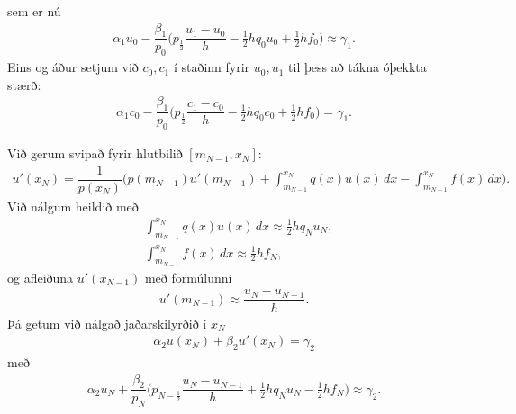 \documentclass[a4paper,10pt,icelandic]{sphinxmanual}
\begin{document}
sem er nú
\begin{equation*}
\begin{split}\alpha_1u_0-\dfrac {\beta_1}{p_0}\bigg(
p_{\frac 12}\dfrac{u_1-u_0}{h}
-\tfrac 12 h q_0u_0+ \tfrac 12 hf_0\bigg)\approx \gamma_1.\end{split}
\end{equation*}
Eins og áður setjum við \(c_0, c_1\) í staðinn fyrir \(u_0, u_1\) til þess að tákna óþekkta stærð:
\begin{equation*}
\begin{split}\alpha_1 c_0-\dfrac {\beta_1}{p_0}\bigg(
p_{\frac 12}\dfrac{c_1-c_0}{h}
-\tfrac 12 h q_0c_0+\tfrac 12 hf_0\bigg)=\gamma_1.\end{split}
\end{equation*}

Við gerum svipað fyrir hlutbilið \([ m_{N-1}, x_N]\):
\begin{equation*}
\begin{split}u'(x_N)=\dfrac 1{p(x_N)}\bigg(p(m_{N-1})u'(m_{N-1})
+\int_{m_{N-1}}^{x_N}q(x)u(x)\, dx-
\int_{m_{N-1}}^{x_N}f(x)\, dx\bigg).\end{split}
\end{equation*}
Við nálgum heildið með
\begin{equation*}
\begin{split}& \int_{m_{N-1}}^{x_N}q(x)u(x)\, dx \approx \tfrac 12h
q_Nu_N, \\
& \int_{m_{N-1}}^{x_N}f(x)\, dx \approx \tfrac 12h f_N,\end{split}
\end{equation*}
og afleiðuna \(u'(x_{N-1})\) með formúlunni
\begin{equation*}
\begin{split}u'(m_{N-1}) \approx\dfrac{u_N-u_{N-1}}{h}.\end{split}
\end{equation*}
Þá getum við nálgað jaðarskilyrðið í \(x_N\)
\begin{equation*}
\begin{split}\alpha_2u(x_N)+\beta_2u'(x_N)=\gamma_2\end{split}
\end{equation*}
með
\begin{equation*}
\begin{split}\alpha_2u_N+\dfrac {\beta_2}{p_N}\bigg(
p_{N-\frac 12}\dfrac{u_N-u_{N-1}}{h}+\tfrac 12h
q_Nu_N -\tfrac 12h f_N\bigg)\approx\gamma_2.\end{split}
\end{equation*}
\end{document}

